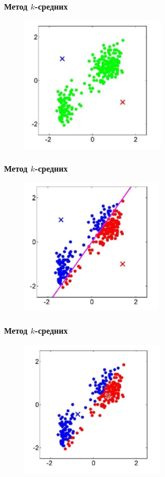 \documentclass[12pt]{beamer}
\begin{document}
\begin{frame}\frametitle{Метод $k$-средних}
\begin{figure}[htbp]
  \includegraphics[height=190pt, keepaspectratio = true]{images/k-means-1}   
\end{figure}
\end{frame}

\begin{frame}\frametitle{Метод $k$-средних}
\begin{figure}[htbp]
  \includegraphics[height=190pt, keepaspectratio = true]{images/k-means-2}   
\end{figure}
\end{frame}

\begin{frame}\frametitle{Метод $k$-средних}
\begin{figure}[htbp]
  \includegraphics[height=190pt, keepaspectratio = true]{images/k-means-3}   
\end{figure}
\end{frame}
\end{document}
